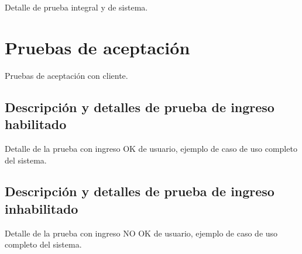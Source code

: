 Detalle de prueba integral y de sistema.

\section{Pruebas de aceptación}

Pruebas de aceptación con cliente.

\subsection{Descripción y detalles de prueba de ingreso habilitado}

Detalle de la prueba con ingreso OK de usuario, ejemplo de caso de uso completo del sistema.

\subsection{Descripción y detalles de prueba de ingreso inhabilitado}

Detalle de la prueba con ingreso NO OK de usuario, ejemplo de caso de uso completo del sistema.
